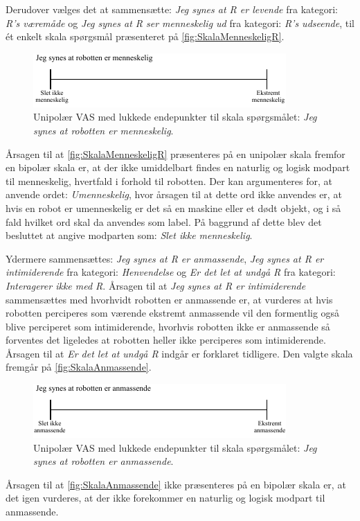 Derudover vælges det at sammensætte: \textit{Jeg synes at R er levende} fra kategori: \textit{R's væremåde} og \textit{Jeg synes at R ser menneskelig ud} fra kategori: \textit{R's udseende}, til ét enkelt skala spørgsmål præsenteret på \autoref{fig:SkalaMenneskeligR}.
%
\begin{figure}[H]
\centering
\includegraphics[width =\textwidth]{Figure/UdvalgteSkalaer/MenneskeligR} 
\caption{Unipolær VAS med lukkede endepunkter til skala spørgsmålet: \textit{Jeg synes at robotten er menneskelig}.}
\label{fig:SkalaMenneskeligR}
\end{figure}
\noindent
%
Årsagen til at \autoref{fig:SkalaMenneskeligR} præsenteres på en unipolær skala fremfor en bipolær skala er, at der ikke umiddelbart findes en naturlig og logisk modpart til menneskelig, hvertfald i forhold til robotten. Der kan argumenteres for, at anvende ordet: \textit{Umenneskelig}, hvor årsagen til at dette ord ikke anvendes er, at hvis en robot er umenneskelig er det så en maskine eller et dødt objekt, og i så fald hvilket ord skal da anvendes som label. På baggrund af dette blev det besluttet at angive modparten som: \textit{Slet ikke menneskelig}.

Ydermere sammensættes: \textit{Jeg synes at R er anmassende}, \textit{Jeg synes at R er intimiderende} fra kategori: \textit{Henvendelse} og \textit{Er det let at undgå R} fra kategori: \textit{Interagerer ikke med R}. Årsagen til at \textit{Jeg synes at R er intimiderende} sammensættes med hvorhvidt robotten er anmassende er, at vurderes at hvis robotten perciperes som værende ekstremt anmassende vil den formentlig også blive perciperet som intimiderende, hvorhvis robotten ikke er anmassende så forventes det ligeledes at robotten heller ikke perciperes som intimiderende. Årsagen til at \textit{Er det let at undgå R} indgår er forklaret tidligere. Den valgte skala fremgår på \autoref{fig:SkalaAnmassende}.  
%
\begin{figure}[H]
\centering
\includegraphics[width =\textwidth]{Figure/UdvalgteSkalaer/Anmassende} 
\caption{Unipolær VAS med lukkede endepunkter til skala spørgsmålet: \textit{Jeg synes at robotten er anmassende}.}
\label{fig:SkalaAnmassende}
\end{figure}
\noindent
%
Årsagen til at \autoref{fig:SkalaAnmassende} ikke præsenteres på en bipolær skala er, at det igen vurderes, at der ikke forekommer en naturlig og logisk modpart til anmassende.

